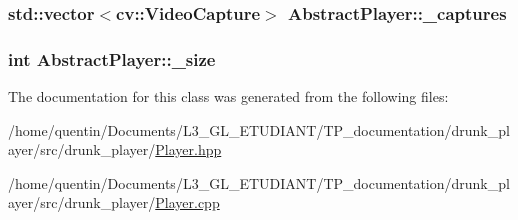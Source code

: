 \subsubsection[{\texorpdfstring{\+\_\+captures}{_captures}}]{\setlength{\rightskip}{0pt plus 5cm}std\+::vector$<$cv\+::\+Video\+Capture$>$ Abstract\+Player\+::\+\_\+captures\hspace{0.3cm}{\ttfamily [protected]}}\hypertarget{classAbstractPlayer_a72dd2ef25310decd45671a7d51e1f319}{}\label{classAbstractPlayer_a72dd2ef25310decd45671a7d51e1f319}
\subsubsection[{\texorpdfstring{\+\_\+size}{_size}}]{\setlength{\rightskip}{0pt plus 5cm}int Abstract\+Player\+::\+\_\+size\hspace{0.3cm}{\ttfamily [protected]}}\hypertarget{classAbstractPlayer_a9d8395a141cc985622d4910209bc7d53}{}\label{classAbstractPlayer_a9d8395a141cc985622d4910209bc7d53}


The documentation for this class was generated from the following files\+:\begin{DoxyCompactItemize}
\item 
/home/quentin/\+Documents/\+L3\+\_\+\+G\+L\+\_\+\+E\+T\+U\+D\+I\+A\+N\+T/\+T\+P\+\_\+documentation/drunk\+\_\+player/src/drunk\+\_\+player/\hyperlink{Player_8hpp}{Player.\+hpp}\item 
/home/quentin/\+Documents/\+L3\+\_\+\+G\+L\+\_\+\+E\+T\+U\+D\+I\+A\+N\+T/\+T\+P\+\_\+documentation/drunk\+\_\+player/src/drunk\+\_\+player/\hyperlink{Player_8cpp}{Player.\+cpp}\end{DoxyCompactItemize}
